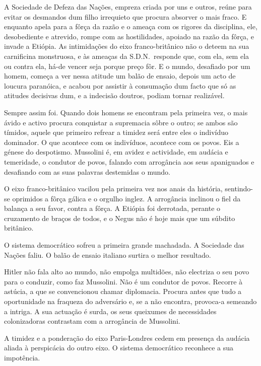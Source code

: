 \documentclass[9pt]{article}
\begin{document}
A Sociedade de Defeza das Na\-ções, empreza criada por uns e outros, reúne
para evitar os desmandos dum fi\-lho irrequieto que procura absor\-ver o mais
fraco. E enquanto apela para a fôrça da razão e o ameaça com os rigores da
disciplina, ele, desobediente e atrevido, rompe com as hostilidades, apoiado
na razão da fôrça, e invade a Etiópia. As intimida\-ções do eixo franco-britânico não o deteem na sua carnificina monstruosa, e às ameaças da S.D.N.\ responde que, com ela, sem ela ou contra ela, há-de vencer seja porque preço fôr.
E o mundo, desafiado por um homem, começa a ver nessa atitude um balão de
ensaio, depois um acto de loucura paranóica, e acabou por assistir à consuma\-ção dum facto que só as atitudes decisivas dum, e a indecisão doutros, podiam
tornar realizável.

Sempre assim foi. Quando dois homens se encontram pela primeira vez, o
mais ávido e activo procura conquistar a supremacia sôbre o outro; se ambos
são tímidos, aquele que primeiro refrear a timidez será entre eles o indivíduo dominador. O que acontece com os indivíduos, acontece com os povos. Eis
a génese do despotismo. Mussolini é, em avidez e actividade, em audácia e temeridade, o condutor de povos, falando com arrogância aos seus apaniguados e
desafiando com as suas palavras destemidas o mundo.

O eixo franco-britânico vacilou pela primeira vez nos anais da his\-tó\-ria, sentindo-se oprimidos a fôrça gálica e o orgu\-lho inglez. A arrogância
inclinou o fiel da balan\-ça a seu favor, contra a fôrça. A Etiópia foi derrotada, perante o cruzamento de braços de todos, e o Negus não é hoje mais que
um súbdito britânico.

O sistema democrático sofreu a primeira gran\-de machadada. A Sociedade
das Na\-ções faliu. O balão de ensaio italiano surtira o me\-lhor resultado.

Hitler não fala alto ao mundo, não empolga multidões, não electriza
o seu povo para o conduzir, como faz Mussolini. Não é um condutor de povos.
Recorre à astúcia, a que se convencionou chamar diplomacia. Procura antes
que tudo a oportunidade na fraqueza do adversário e, se a não encontra, provoca-a semeando a intriga. A sua actua\-ção é surda, os seus queixumes de necessidades colonizadoras contrastam com a arrogância de Mussolini.

A timidez e a pondera\-ção do eixo Paris-Londres cedem em presença da
audácia aliada à perspicácia do outro eixo. O sistema democrático reconhece
a sua impotência.
\end{document}
